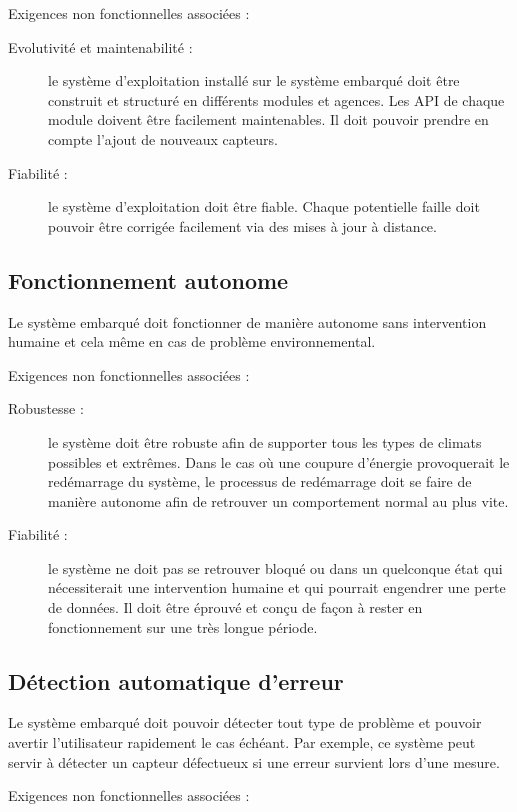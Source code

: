 \documentclass{mise_en_page}
\begin{document}
Exigences non fonctionnelles associées : 

\begin{description}
\item[Evolutivité et maintenabilité :] le système d’exploitation installé
sur le système embarqué doit être construit et structuré en différents
modules et agences. Les API de chaque module doivent être facilement
maintenables. Il doit pouvoir prendre en compte l’ajout de nouveaux
capteurs.
\item[Fiabilité :] le système d’exploitation doit être fiable. Chaque
potentielle faille doit pouvoir être corrigée facilement via des mises
à jour à distance. 
\end{description}
\subsection{Fonctionnement autonome}
Le système embarqué doit fonctionner de manière autonome sans
intervention humaine et cela même en cas de problème environnemental.

Exigences non fonctionnelles associées : 

\begin{description}
\item[Robustesse :] le système doit être robuste afin de supporter tous
les types de climats possibles et extrêmes. Dans le cas où une coupure
d’énergie provoquerait le redémarrage du système, le processus de
redémarrage doit se faire de manière autonome afin de retrouver un
comportement normal au plus vite.
\item[Fiabilité :] le système ne doit pas se retrouver bloqué ou dans un
quelconque état qui nécessiterait une intervention humaine et qui
pourrait engendrer une perte de données. Il doit être éprouvé et conçu
de façon à rester en fonctionnement sur une très longue période. 
\end{description}
\subsection{Détection automatique d’erreur}
Le système embarqué doit pouvoir détecter tout type de problème et
pouvoir avertir l’utilisateur rapidement le cas échéant. Par exemple,
ce système peut servir à détecter un capteur défectueux si une erreur
survient lors d’une mesure.

Exigences non fonctionnelles associées : 
\end{document}
